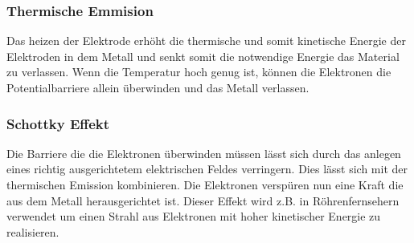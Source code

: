 \subsubsection{Thermische Emmision}
Das heizen der Elektrode erhöht die thermische und somit kinetische Energie der Elektroden in dem Metall und senkt somit die notwendige Energie das Material zu verlassen. Wenn die Temperatur hoch genug ist, können die Elektronen die Potentialbarriere allein überwinden und das Metall verlassen.
\subsubsection{Schottky Effekt}
Die Barriere die die Elektronen überwinden müssen lässt sich durch das anlegen eines richtig ausgerichtetem elektrischen Feldes verringern. Dies lässt sich mit der thermischen Emission kombinieren. Die Elektronen verspüren nun eine Kraft die aus dem Metall herausgerichtet ist. Dieser Effekt wird z.B. in Röhrenfernsehern verwendet um einen Strahl aus Elektronen mit hoher kinetischer Energie zu realisieren. \cite{cooray2014}
